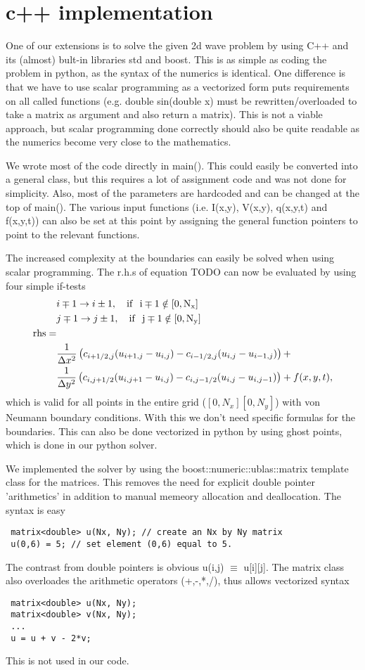 \documentclass[a4paper,10pt]{article}
\renewcommand{\(}{\left(}
\renewcommand{\)}{\right)}
\begin{document}
\section{c++ implementation}
One of our extensions is to solve the given 2d wave problem by using C++ and its (almost) bult-in libraries std and boost. This is as simple as coding the problem in python,
as the syntax of the numerics is identical. One difference is that we have to use scalar programming as a vectorized form 
puts requirements on all called functions (e.g. double sin(double x) must be rewritten/overloaded to take a matrix as argument and also return a matrix). This is not a viable approach, but scalar programming
done correctly should also be quite readable as the numerics become very close to the mathematics.

We wrote most of the code directly in main(). This could easily be converted into a general class, but this requires a lot of assignment code and was not done for simplicity.
Also, most of the parameters are hardcoded and can be changed at the top of main(). The various input functions (i.e. I(x,y), V(x,y), q(x,y,t) and f(x,y,t)) can also be set at this point by assigning
the general function pointers to point to the relevant functions.

The increased complexity at the boundaries can easily be solved when using scalar programming. The r.h.s of equation TODO can now be evaluated by using four simple if-tests
\begin{align*}
&i \mp 1 \rightarrow i\pm 1, \ \ \ \rm if \ \ i \mp 1 \notin  [0,N_x]\\
&j \mp 1 \rightarrow j\pm 1, \ \ \ \rm if \ \ j \mp 1 \notin  [0,N_y]\\
\rm rhs = & \\
&\frac{1}{\Delta x^2} \left( c_{i+1/2,j} (u_{i+1,j} - u_{i,j}) - c_{i-1/2,j}(u_{i,j} - u_{i-1,j}) \right)  + \\
&\frac{1}{\Delta y^2} \left( c_{i,j+1/2} (u_{i,j+1} - u_{i,j}) - c_{i,j-1/2}(u_{i,j} - u_{i,j-1}) \right) + f(x,y,t),
\end{align*}
which is valid for all points in the entire grid ($[0,N_x][0,N_y]$) with von Neumann boundary conditions. With this we don't need specific formulas for the boundaries. This can also be done vectorized in python by
using ghost points, which is done in our python solver.

We implemented the solver by using the boost::numeric::ublas::matrix template class for the matrices. This removes the need for explicit double pointer 'arithmetics' in addition to manual memeory allocation and deallocation.
The syntax is easy
\begin{lstlisting}
 matrix<double> u(Nx, Ny); // create an Nx by Ny matrix
 u(0,6) = 5; // set element (0,6) equal to 5.
\end{lstlisting}
The contrast from double pointers is obvious u(i,j) $\equiv$ u[i][j]. The matrix class also overloades the arithmetic operators (+,-,*,/), thus allows vectorized syntax
\begin{lstlisting}
 matrix<double> u(Nx, Ny);
 matrix<double> v(Nx, Ny);
 ...
 u = u + v - 2*v;
\end{lstlisting}
This is not used in our code.
\end{document}
